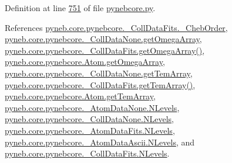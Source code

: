 Definition at line \hyperlink{pynebcore_8py_source_l00751}{751} of file \hyperlink{pynebcore_8py_source}{pynebcore.\-py}.



References \hyperlink{pynebcore_8py_source_l00673}{pyneb.\-core.\-pynebcore.\-\_\-\-Coll\-Data\-Fits.\-\_\-\-Cheb\-Order}, \hyperlink{pynebcore_8py_source_l00074}{pyneb.\-core.\-pynebcore.\-\_\-\-Coll\-Data\-None.\-get\-Omega\-Array}, \hyperlink{pynebcore_8py_source_l00800}{pyneb.\-core.\-pynebcore.\-\_\-\-Coll\-Data\-Fits.\-get\-Omega\-Array()}, \hyperlink{pynebcore_8py_source_l01283}{pyneb.\-core.\-pynebcore.\-Atom.\-get\-Omega\-Array}, \hyperlink{pynebcore_8py_source_l00075}{pyneb.\-core.\-pynebcore.\-\_\-\-Coll\-Data\-None.\-get\-Tem\-Array}, \hyperlink{pynebcore_8py_source_l00897}{pyneb.\-core.\-pynebcore.\-\_\-\-Coll\-Data\-Fits.\-get\-Tem\-Array()}, \hyperlink{pynebcore_8py_source_l01284}{pyneb.\-core.\-pynebcore.\-Atom.\-get\-Tem\-Array}, \hyperlink{pynebcore_8py_source_l00069}{pyneb.\-core.\-pynebcore.\-\_\-\-Atom\-Data\-None.\-N\-Levels}, \hyperlink{pynebcore_8py_source_l00082}{pyneb.\-core.\-pynebcore.\-\_\-\-Coll\-Data\-None.\-N\-Levels}, \hyperlink{pynebcore_8py_source_l00098}{pyneb.\-core.\-pynebcore.\-\_\-\-Atom\-Data\-Fits.\-N\-Levels}, \hyperlink{pynebcore_8py_source_l00319}{pyneb.\-core.\-pynebcore.\-\_\-\-Atom\-Data\-Ascii.\-N\-Levels}, and \hyperlink{pynebcore_8py_source_l00586}{pyneb.\-core.\-pynebcore.\-\_\-\-Coll\-Data\-Fits.\-N\-Levels}.


